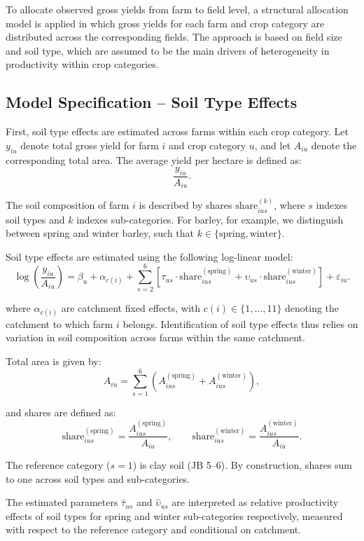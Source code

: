 \documentclass{article}
\begin{document}
To allocate observed gross yields from farm to field level, a structural allocation model is applied in which gross yields for each farm and crop category are distributed across the corresponding fields. The approach is based on field size and soil type, which are assumed to be the main drivers of heterogeneity in productivity within crop categories. 

\subsection{Model Specification – Soil Type Effects}

First, soil type effects are estimated across farms within each crop category. Let $y_{iu}$ denote total gross yield for farm $i$ and crop category $u$, and let $A_{iu}$ denote the corresponding total area. The average yield per hectare is defined as:
\[
\frac{y_{iu}}{A_{iu}}.
\]

The soil composition of farm $i$ is described by shares $\text{share}_{ius}^{(k)}$, where $s$ indexes soil types and $k$ indexes sub-categories. For barley, for example, we distinguish between spring and winter barley, such that $k \in \{\text{spring},\text{winter}\}$.

Soil type effects are estimated using the following log-linear model:
\[
\log\!\left(\frac{y_{iu}}{A_{iu}}\right)
=
\beta_u
+
\alpha_{c(i)}
+
\sum_{s=2}^{6}
\left[
\tau_{us} \cdot \text{share}_{ius}^{(\text{spring})}
+
\upsilon_{us} \cdot \text{share}_{ius}^{(\text{winter})}
\right]
+
\varepsilon_{iu}.
\]

where $\alpha_{c(i)}$ are catchment fixed effects, with $c(i) \in \{1,\dots,11\}$ denoting the catchment to which farm $i$ belongs. Identification of soil type effects thus relies on variation in soil composition across farms within the same catchment.

Total area is given by:
\[
A_{iu}
=
\sum_{s=1}^{6}
\left(
A_{ius}^{(\text{spring})}
+
A_{ius}^{(\text{winter})}
\right),
\]

and shares are defined as:
\[
\text{share}_{ius}^{(\text{spring})}
=
\frac{A_{ius}^{(\text{spring})}}{A_{iu}},
\qquad
\text{share}_{ius}^{(\text{winter})}
=
\frac{A_{ius}^{(\text{winter})}}{A_{iu}}.
\]

The reference category ($s=1$) is clay soil (JB 5--6). By construction, shares sum to one across soil types and sub-categories.

The estimated parameters $\hat{\tau}_{us}$ and $\hat{\upsilon}_{us}$ are interpreted as relative productivity effects of soil types for spring and winter sub-categories respectively, measured with respect to the reference category and conditional on catchment.
\end{document}
